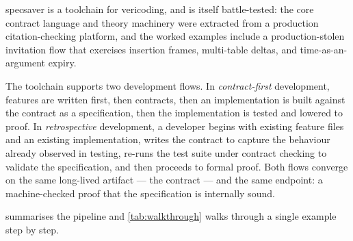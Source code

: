 \documentclass[11pt,a4paper]{article}
\begin{document}
\textsf{specsaver} is a toolchain for vericoding, and is itself
battle-tested: the core contract language and theory machinery were
extracted from a production citation-checking platform, and the worked
examples include a production-stolen invitation flow that exercises
insertion frames, multi-table deltas, and time-as-an-argument expiry.

The toolchain supports two development flows.  In
\emph{contract-first} development, features are written first, then
contracts, then an implementation is built against the contract as a
specification, then the implementation is tested and lowered to proof.
In \emph{retrospective} development, a developer begins with existing
feature files and an existing implementation, writes the contract to
capture the behaviour already observed in testing, re-runs the test
suite under contract checking to validate the specification, and then
proceeds to formal proof.  Both flows converge on the same long-lived
artifact --- the contract --- and the same endpoint: a machine-checked
proof that the specification is internally sound.

 summarises the pipeline and \cref{tab:walkthrough}
walks through a single example step by step.
\end{document}
